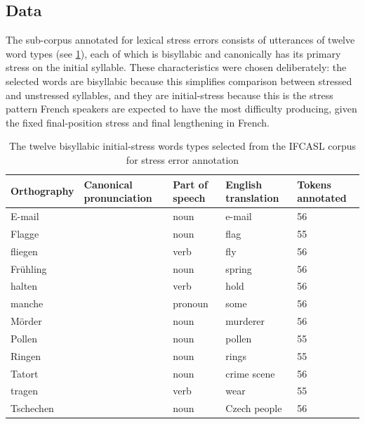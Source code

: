 	
	\subsection{Data}
	
	The sub-corpus annotated for lexical stress errors consists of utterances of twelve word types (see \cref{tab:bisyllwords}), each of which is bisyllabic and canonically has its primary stress on the initial syllable. These characteristics were chosen deliberately: the selected words are bisyllabic because this simplifies comparison between stressed and unstressed syllables, and they are initial-stress because this is the stress pattern French speakers are expected to have the most difficulty producing, given the fixed final-position stress and final lengthening in French.
	
	\begin{table}[htb]
		\centering
		\caption{The twelve bisyllabic initial-stress words types selected from the IFCASL corpus for stress error annotation%
		}
		
		\begin{tabularx}{\textwidth}{lXXXX}
		\toprule
		Orthography & Canonical \linebreak pronunciation & Part of speech & English \linebreak translation & Tokens \linebreak annotated\\
		\midrule
		E-mail	&	\TODO{prons} &	noun &	e-mail &	56	\\
		Flagge	&	&	noun &	 flag &	55	\\
		fliegen	&	&	verb &	fly &	56	\\
		Frühling	&	& noun	&	spring &	56	\\
		halten	&	&	verb &	hold &	56	\\
		manche	&	&	pronoun &	some &	56	\\
		Mörder	&	&	noun &	murderer &	56	\\
		Pollen	&	&	noun &	pollen &	55	\\
		Ringen	&	&	noun &	rings &	55	\\
		Tatort	&	&	noun &	crime scene &	56	\\
		tragen	&	&	verb &	wear &	55	\\
		Tschechen	&	& noun	&	Czech people &	56	\\
		\bottomrule
		\end{tabularx}
		\label{tab:bisyllwords}
	\end{table}

